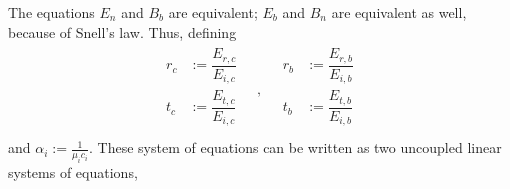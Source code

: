 \documentclass[letterpaper,10pt,italian]{jupyterBook}
\begin{document}
\sphinxAtStartPar
The equations \(E_n\) and \(B_b\) are equivalent; \(E_b\) and \(B_n\) are equivalent as well, because of Snell’s law. Thus, defining
\begin{equation*}
\begin{split}
\begin{aligned}
  r_c & := \dfrac{E_{r,c}}{E_{i,c}} \\
  t_c & := \dfrac{E_{t,c}}{E_{i,c}} \\
\end{aligned}
\quad , \quad
\begin{aligned}
  r_b & := \dfrac{E_{r,b}}{E_{i,b}} \\
  t_b & := \dfrac{E_{t,b}}{E_{i,b}} \\
\end{aligned}
\end{split}
\end{equation*}
\sphinxAtStartPar
and \(\alpha_i := \frac{1}{\mu_i c_i}\). These system of equations can be written as two uncoupled linear systems of equations,
\end{document}
